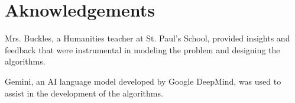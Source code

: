 \documentclass[11pt]{article}
\begin{document}
\section{Aknowledgements}

Mrs. Buckles, a Humanities teacher at St. Paul's School, provided insights and feedback that were instrumental in modeling the problem and designing the algorithms.

Gemini, an AI language model developed by Google DeepMind, was used to assist in the development of the algorithms.



\end{document}
